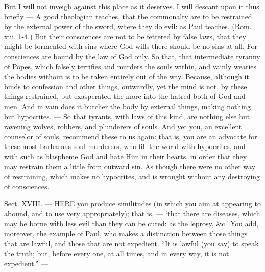 But I will not inveigh against this place as it deserves. I will descant upon it thus briefly — A good theologian teaches, that the commonalty are to be restrained by the external power of the sword, where they do evil: as Paul teaches. (Rom. xiii. 1-4.) But their consciences are not to be fettered by false laws, that they might be tormented with sins where God wills there should be no sins at all. For consciences are bound by the law of God only. So that, that intermediate tyranny of Popes, which falsely terrifies and murders the souls within, and vainly wearies the bodies without is to be taken entirely out of the way. Because, although it binds to confession and other things, outwardly, yet the mind is not, by these things restrained, but exasperated the more into the hatred both of God and men. And in vain does it butcher the body by external things, making nothing but hypocrites. — So that tyrants, with laws of this kind, are nothing else but ravening wolves, robbers, and plunderers of souls. And yet you, an excellent counselor of souls, recommend these to us again: that is, you are an advocate for these most barbarous soul-murderers, who fill the world with hypocrites, and with such as blaspheme God and hate Him in their hearts, in order that they may restrain them a little from outward sin. As though there were no other way of restraining, which makes no hypocrites, and is wrought without any destroying of consciences.


Sect. XVIII. — HERE you produce similitudes (in which you aim at appearing to abound, and to use very appropriately); that is, — ‘that there are diseases, which may be borne with less evil than they can be cured: as the leprosy, \&c.’ You add, moreover, the example of Paul, who makes a distinction between those things that are lawful, and those that are not expedient. “It is lawful (you say) to speak the truth; but, before every one, at all times, and in every way, it is not expedient.” —

